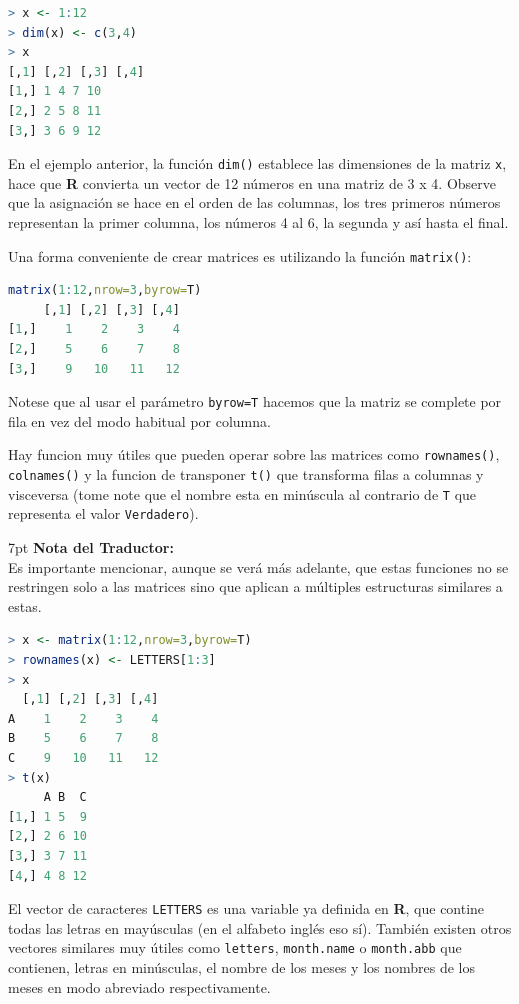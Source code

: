 \documentclass[spanish]{extbook}
\newenvironment{tradnote}{%
  \def\FrameCommand{%
    \hspace{1pt}%
    {\color{darkblue}\vrule width 2pt}%
    {\color{formalshade}\vrule width 4pt}%
    \colorbox{formalshade}%
  }%
  \vspace{12pt}
  \MakeFramed{\advance\hsize-\width\FrameRestore}%
  \noindent\hspace{-4.55pt}%
  \begin{adjustwidth}{}{7pt}%
  \vspace{1pt}%
  \textbf{Nota del Traductor:\\}%
}
{%
  \vspace{6pt}\end{adjustwidth}\endMakeFramed%
}
\numberwithin{equation}{section}
\numberwithin{figure}{section}
\begin{document}
\begin{lstlisting}[language=R]
> x <- 1:12
> dim(x) <- c(3,4)
> x
[,1] [,2] [,3] [,4]
[1,] 1 4 7 10
[2,] 2 5 8 11
[3,] 3 6 9 12
\end{lstlisting}

En el ejemplo anterior, la función \texttt{dim()} establece las dimensiones de
la matriz \texttt{x}, hace que \textbf{R} convierta un vector de 12 números en
una matriz de 3 x 4. Observe que la asignación se hace en el orden de las
columnas, los tres primeros números representan la primer columna, los números
4 al 6, la segunda y así hasta el final.

Una forma conveniente de crear matrices es utilizando la función \texttt{matrix()}:

\begin{lstlisting}[language=R]
matrix(1:12,nrow=3,byrow=T)
     [,1] [,2] [,3] [,4]
[1,]    1    2    3    4
[2,]    5    6    7    8
[3,]    9   10   11   12
\end{lstlisting}

Notese que al usar el parámetro \texttt{byrow=T} hacemos que la matriz se
complete por fila en vez del modo habitual por columna.

Hay funcion muy útiles que pueden operar sobre las matrices como
\texttt{rownames()}, \texttt{colnames()} y la funcion de transponer
\texttt{t()} que transforma filas a columnas y visceversa (tome note que el
nombre esta en minúscula al contrario de \texttt{T} que representa el valor
\texttt{Verdadero}).

\begin{tradnote} Es importante mencionar, aunque se verá más adelante, que
estas funciones no se restringen solo a las matrices sino que aplican a
múltiples estructuras similares a estas.\end{tradnote} \newpage

\begin{lstlisting}[language=R]
> x <- matrix(1:12,nrow=3,byrow=T)
> rownames(x) <- LETTERS[1:3]
> x
  [,1] [,2] [,3] [,4]
A    1    2    3    4
B    5    6    7    8
C    9   10   11   12
> t(x)
     A B  C
[1,] 1 5  9
[2,] 2 6 10
[3,] 3 7 11
[4,] 4 8 12
\end{lstlisting}

El vector de caracteres \texttt{LETTERS} es una variable ya definida en
\textbf{R}, que contine todas las letras en mayúsculas (en el alfabeto inglés
eso sí). También existen otros vectores similares muy útiles como
\texttt{letters}, \texttt{month.name} o \texttt{month.abb} que contienen,
letras en minúsculas, el nombre de los meses y los nombres de los meses en modo
abreviado respectivamente.
\end{document}
